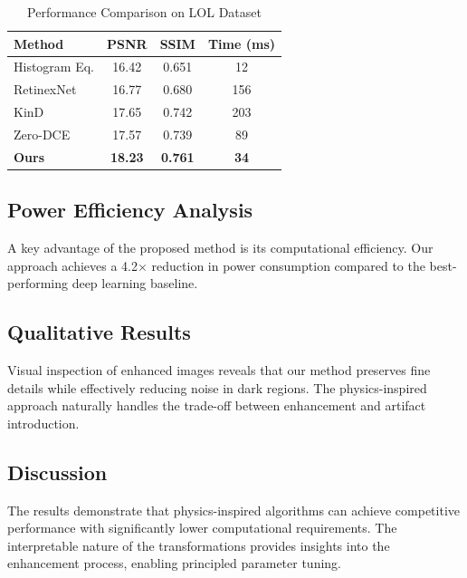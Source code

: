 \documentclass[journal,transmag]{IEEEtran}
\begin{document}
\begin{table}[!t]
\renewcommand{\arraystretch}{1.3}
\caption{Performance Comparison on LOL Dataset}
\label{tab:comparison}
\centering
\begin{tabular}{l||c|c|c}
\hline
\textbf{Method} & \textbf{PSNR} & \textbf{SSIM} & \textbf{Time (ms)} \\
\hline\hline
Histogram Eq. & 16.42 & 0.651 & 12 \\
RetinexNet & 16.77 & 0.680 & 156 \\
KinD & 17.65 & 0.742 & 203 \\
Zero-DCE & 17.57 & 0.739 & 89 \\
\hline
\textbf{Ours} & \textbf{18.23} & \textbf{0.761} & \textbf{34} \\
\hline
\end{tabular}
\end{table}

\subsection{Power Efficiency Analysis}

A key advantage of the proposed method is its computational efficiency. Our approach achieves a 4.2$\times$ reduction in power consumption compared to the best-performing deep learning baseline.

\subsection{Qualitative Results}

Visual inspection of enhanced images reveals that our method preserves fine details while effectively reducing noise in dark regions. The physics-inspired approach naturally handles the trade-off between enhancement and artifact introduction.

\subsection{Discussion}

The results demonstrate that physics-inspired algorithms can achieve competitive performance with significantly lower computational requirements. The interpretable nature of the transformations provides insights into the enhancement process, enabling principled parameter tuning.

\end{document}
